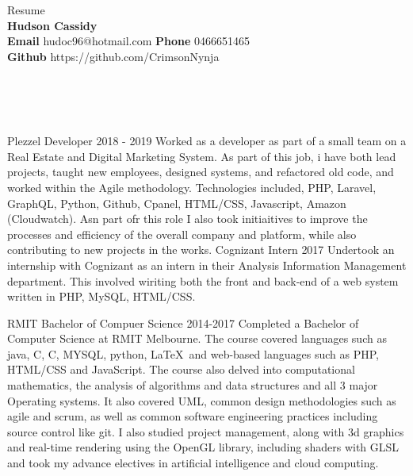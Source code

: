 \documentclass[9pt]{developercv}
\newcommand{\CC}{C\nolinebreak\hspace{-.05em}\raisebox{.4ex}{\tiny\bf +}\nolinebreak\hspace{-.10em}\raisebox{.4ex}{\tiny\bf +}}
\def\CC{{C\nolinebreak[4]\hspace{-.05em}\raisebox{.4ex}{\tiny\bf ++}}}
\begin{document}
	\begin{minipage}[a]{1.0\textwidth}
		\begin{center}
			{\HUGE Resume}\\
			\textbf {Hudson Cassidy} \\
			\textbf {Email} hudoc96@hotmail.com
			\textbf {Phone} 0466651465 \\
			\textbf {Github} https://github.com/CrimsonNynja \\
		\end{center}
	\end{minipage}
	\\
	\\
	\\
	\begin{minipage}[t]{0.6\textwidth}
		\begin{entrylist}
			\entry
				{Plezzel}
				{Developer}
				{2018 - 2019}
				{Worked as a developer as part of a small team on a Real Estate and Digital Marketing System. As part of this job, i have both lead projects, taught new employees, designed systems, and refactored old code, and worked within the Agile methodology. Technologies included, PHP, Laravel, GraphQL, Python, Github, Cpanel, HTML/CSS, Javascript, Amazon (Cloudwatch). Asn part ofr this role I also took initiaitives to improve the processes and efficiency of the overall company and platform, while also contributing to new projects in the works.}
			\entry
				{Cognizant}
				{Intern}
				{2017}
				{Undertook an internship with Cognizant as an intern in their Analysis Information Management department. This involved wiriting both the front and back-end of a web system written in PHP, MySQL, HTML/CSS.}
		\end{entrylist}	
		\cvsect{Education}
		\begin{entrylist}
			\entry
				{RMIT}
				{Bachelor of Compuer Science}
				{2014-2017}
				{Completed a Bachelor of Computer Science at RMIT Melbourne. The course covered languages such as java, C, \CC, MYSQL, python, \LaTeX  \  and web-based languages such as PHP, HTML/CSS and JavaScript. The course also delved into computational mathematics, the analysis of algorithms and data structures and all 3 major Operating systems. It also covered UML, common design methodologies such as agile and scrum, as well as common software engineering practices including source control like git. I also studied project management, along with 3d graphics and real-time rendering using the OpenGL library, including shaders with GLSL and took my advance electives in artificial intelligence and cloud computing.}

\end{entrylist}
\end{minipage}
\end{document}
